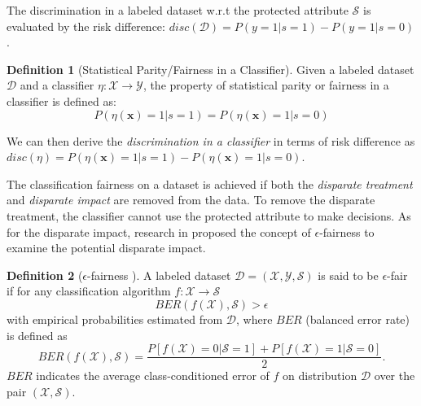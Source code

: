 \documentclass[sigconf]{acmart}
\theoremstyle{definition}
\newtheorem{definition}{Definition}
\begin{document}
The discrimination in a labeled dataset w.r.t the protected attribute $\mathcal{S}$ is evaluated by the risk difference: $disc(\mathcal{D}) = P(y=1|s=1)-P(y=1|s=0)$.

\begin{definition}[Statistical Parity/Fairness in a Classifier]
	Given a labeled dataset $\mathcal{D}$ and a classifier $\eta: \mathcal{X} \rightarrow \mathcal{Y}$, the property of statistical parity or fairness in a classifier is defined as:
	\[
		P(\eta(\mathbf{x})=1|s=1)=P(\eta(\mathbf{x})=1|s=0)
	\]
\end{definition}

We can then derive the \textit{discrimination in a classifier} in terms of risk difference as $disc(\eta) = P(\eta(\mathbf{x})=1|s=1)-P(\eta(\mathbf{x})=1|s=0)$.

The classification fairness on a dataset is achieved if both the \textit{disparate treatment} and \textit{disparate impact} are removed from the data. 
To remove the disparate treatment, the classifier cannot use the protected attribute to make decisions. As for the disparate impact,
research in \cite{Feldman2015Certifying} proposed the concept of $\epsilon$-fairness to examine the potential disparate impact. 

\begin{definition}[$\epsilon$-fairness \cite{Feldman2015Certifying}]
	A labeled dataset $\mathcal{D}=(\mathcal{X}, \mathcal{Y}, \mathcal{S})$ is said to be $\epsilon$-fair if for any classification algorithm $f: \mathcal{X} \rightarrow \mathcal{S}$
	\[	
		BER(f(\mathcal{X}), \mathcal{S}) > \epsilon
	\]
	with empirical probabilities estimated from $\mathcal{D}$, where $BER$ (balanced error rate) is defined as
	\[
		BER(f(\mathcal{X}), \mathcal{S}) = \frac{P[f(\mathcal{X})=0|\mathcal{S}=1]+P[f(\mathcal{X})=1|\mathcal{S}=0]}{2}.
	\]
	$BER$  indicates the average class-conditioned error of $f$ on distribution $\mathcal{D}$ over the pair $(\mathcal{X}, \mathcal{S})$.
\end{definition}
\end{document}
